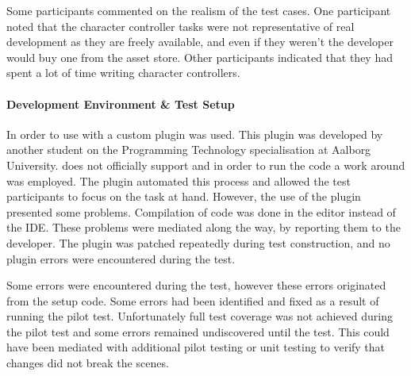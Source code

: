 Some participants commented on the realism of the test cases. One participant noted that the character controller tasks were not representative of real development as they are freely available, and even if they weren't the developer would buy one from the asset store. Other participants indicated that they had spent a lot of time writing character controllers.

\paragraph{Development Environment \& Test Setup}
In order to use \fs with \unity a custom plugin was used. This plugin was developed by another student on the Programming Technology specialisation at Aalborg University\cite{fsharp2019plugin}. \unity does not officially support \fs and in order to run the \fs code a work around was employed. The plugin automated this process and allowed the test participants to focus on the task at hand. However, the use of the plugin presented some problems. Compilation of \fs code was done in the \unity editor instead of the \gls{IDE}. These problems were mediated along the way, by reporting them to the developer. The plugin was patched repeatedly during test construction, and no plugin errors were encountered during the test.

Some errors were encountered during the test, however these errors originated from the setup code. Some errors had been identified and fixed as a result of running the pilot test. Unfortunately full test coverage was not achieved during the pilot test and some errors remained undiscovered until the test. This could have been mediated with additional pilot testing or unit testing to verify that changes did not break the scenes.
